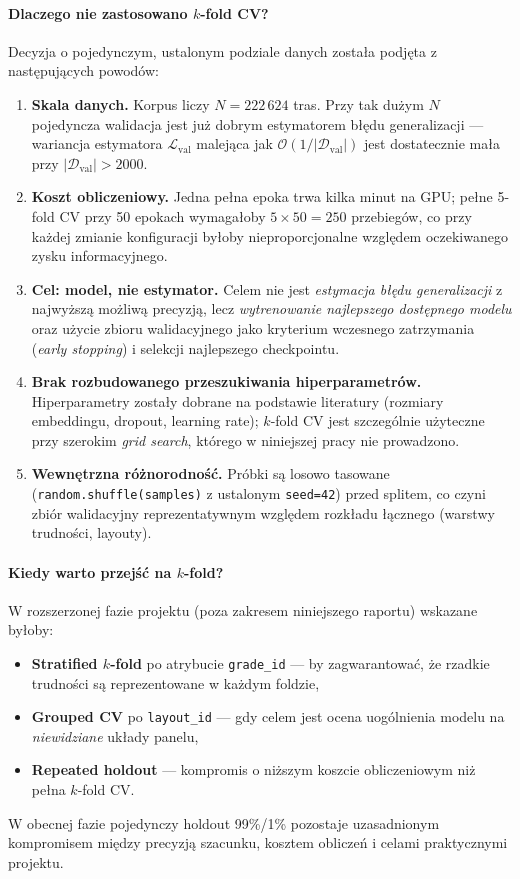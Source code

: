 \documentclass[12pt,a4paper]{article}
\begin{document}
\paragraph{Dlaczego nie zastosowano $k$-fold CV?}
Decyzja o pojedynczym, ustalonym podziale danych została podjęta z następujących powodów:
\begin{enumerate}[leftmargin=1.5em]
    \item \textbf{Skala danych.} Korpus liczy $N = 222\,624$ tras. Przy tak dużym $N$ pojedyncza walidacja jest już dobrym estymatorem błędu generalizacji --- wariancja estymatora $\mathcal{L}_{\text{val}}$ malejąca jak $\mathcal{O}(1/|\mathcal{D}_{\text{val}}|)$ jest dostatecznie mała przy $|\mathcal{D}_{\text{val}}| > 2000$.
    \item \textbf{Koszt obliczeniowy.} Jedna pełna epoka trwa kilka minut na GPU; pełne 5-fold CV przy 50 epokach wymagałoby $5 \times 50 = 250$ przebiegów, co przy każdej zmianie konfiguracji byłoby nieproporcjonalne względem oczekiwanego zysku informacyjnego.
    \item \textbf{Cel: model, nie estymator.} Celem nie jest \emph{estymacja błędu generalizacji} z najwyższą możliwą precyzją, lecz \emph{wytrenowanie najlepszego dostępnego modelu} oraz użycie zbioru walidacyjnego jako kryterium wczesnego zatrzymania (\textit{early stopping}) i selekcji najlepszego checkpointu.
    \item \textbf{Brak rozbudowanego przeszukiwania hiperparametrów.} Hiperparametry zostały dobrane na podstawie literatury (rozmiary embeddingu, dropout, learning rate); $k$-fold CV jest szczególnie użyteczne przy szerokim \emph{grid search}, którego w niniejszej pracy nie prowadzono.
    \item \textbf{Wewnętrzna różnorodność.} Próbki są losowo tasowane (\texttt{random.shuffle(samples)} z ustalonym \texttt{seed=42}) przed splitem, co czyni zbiór walidacyjny reprezentatywnym względem rozkładu łącznego (warstwy trudności, layouty).
\end{enumerate}

\paragraph{Kiedy warto przejść na $k$-fold?}
W rozszerzonej fazie projektu (poza zakresem niniejszego raportu) wskazane byłoby:
\begin{itemize}[leftmargin=1.5em]
    \item \textbf{Stratified $k$-fold} po atrybucie \texttt{grade\_id} --- by zagwarantować, że rzadkie trudności są reprezentowane w każdym foldzie,
    \item \textbf{Grouped CV} po \texttt{layout\_id} --- gdy celem jest ocena uogólnienia modelu na \emph{niewidziane} układy panelu,
    \item \textbf{Repeated holdout} --- kompromis o niższym koszcie obliczeniowym niż pełna $k$-fold CV.
\end{itemize}
W obecnej fazie pojedynczy holdout 99\%/1\% pozostaje uzasadnionym kompromisem między precyzją szacunku, kosztem obliczeń i celami praktycznymi projektu.
\end{document}
